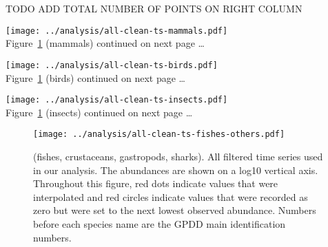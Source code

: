 
\clearpage
\renewcommand{\thetable}{S\arabic{table}}
\setcounter{table}{0}
TODO ADD TOTAL NUMBER OF POINTS ON RIGHT COLUMN

\clearpage


\renewcommand{\thefigure}{S\arabic{figure}}
\setcounter{figure}{0}


\begin{centering}
\clearpage
\texttt{[image: ../analysis/all-clean-ts-mammals.pdf]}\\
Figure~\ref{fig:all-ts} (mammals) continued on next page \ldots

\clearpage
\texttt{[image: ../analysis/all-clean-ts-birds.pdf]}\\
Figure~\ref{fig:all-ts} (birds) continued on next page \ldots

\clearpage
\texttt{[image: ../analysis/all-clean-ts-insects.pdf]}\\
Figure~\ref{fig:all-ts} (insects) continued on next page \ldots

\end{centering}

\begin{figure}[htbp]
\begin{center}
\texttt{[image: ../analysis/all-clean-ts-fishes-others.pdf]}
\caption{
  (fishes, crustaceans, gastropods, sharks). All filtered time series used in our analysis. The abundances are shown on a log10 vertical axis. Throughout this figure, red dots indicate values that were interpolated and red circles indicate values that were recorded as zero but were set to the next lowest observed abundance. Numbers before each species name are the GPDD main identification numbers.
}
\label{fig:all-ts}
\end{center}
\end{figure}


